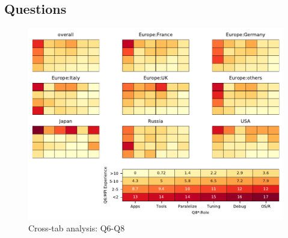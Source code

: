 
\subsection{Questions}


\begin{figure}
\begin{center}
\includegraphics[width=12cm]{../pdfs/Q6-Q8.pdf}
\caption{Cross-tab analysis: Q6-Q8}
\label{fig:Q6-Q8}
\end{center}
\end{figure}
